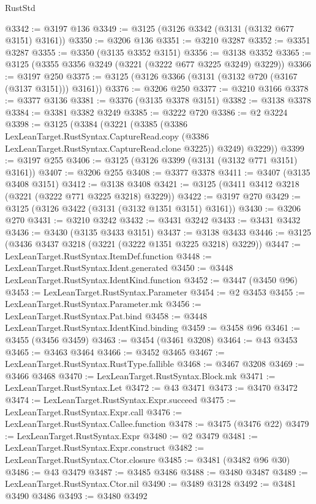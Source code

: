 \begin{lexlean}{RustStd}
\begin{coremodule}
@3342 := @3197 @136
@3349 := @3125 (@3126 @3342 (@3131 (@3132 @677 @3151) @3161))
@3350 := @3206 @136
@3351 := @3210 @3287
@3352 := @3351 @3287
@3355 := @3350 (@3135 @3352 @3151)
@3356 := @3138 @3352
@3365 := @3125 (@3355 @3356 @3249 (@3221 (@3222 @677 @3225 @3249) @3229))
@3366 := @3197 @250
@3375 := @3125 (@3126 @3366 (@3131 (@3132 @720 (@3167 (@3137 @3151))) @3161))
@3376 := @3206 @250
@3377 := @3210 @3166
@3378 := @3377 @3136
@3381 := @3376 (@3135 @3378 @3151)
@3382 := @3138 @3378
@3384 := @3381 @3382 @3249
@3385 := @3222 @720
@3386 := @2 @3224
@3398 := @3125
    (@3384
      (@3221
        (@3385
          (@3386
            LexLeanTarget.RustSyntax.CaptureRead.copy
            (@3386 LexLeanTarget.RustSyntax.CaptureRead.clone @3225))
          @3249)
        @3229))
@3399 := @3197 @255
@3406 := @3125 (@3126 @3399 (@3131 (@3132 @771 @3151) @3161))
@3407 := @3206 @255
@3408 := @3377 @3378
@3411 := @3407 (@3135 @3408 @3151)
@3412 := @3138 @3408
@3421 := @3125 (@3411 @3412 @3218 (@3221 (@3222 @771 @3225 @3218) @3229))
@3422 := @3197 @270
@3429 := @3125 (@3126 @3422 (@3131 (@3132 @1351 @3151) @3161))
@3430 := @3206 @270
@3431 := @3210 @3242
@3432 := @3431 @3242
@3433 := @3431 @3432
@3436 := @3430 (@3135 @3433 @3151)
@3437 := @3138 @3433
@3446 := @3125 (@3436 @3437 @3218 (@3221 (@3222 @1351 @3225 @3218) @3229))
@3447 := LexLeanTarget.RustSyntax.ItemDef.function
@3448 := LexLeanTarget.RustSyntax.Ident.generated
@3450 := @3448 LexLeanTarget.RustSyntax.IdentKind.function
@3452 := @3447 (@3450 @96)
@3453 := LexLeanTarget.RustSyntax.Parameter
@3454 := @2 @3453
@3455 := LexLeanTarget.RustSyntax.Parameter.mk
@3456 := LexLeanTarget.RustSyntax.Pat.bind
@3458 := @3448 LexLeanTarget.RustSyntax.IdentKind.binding
@3459 := @3458 @96
@3461 := @3455 (@3456 @3459)
@3463 := @3454 (@3461 @3208)
@3464 := @43 @3453
@3465 := @3463 @3464
@3466 := @3452 @3465
@3467 := LexLeanTarget.RustSyntax.RustType.fallible
@3468 := @3467 @3208
@3469 := @3466 @3468
@3470 := LexLeanTarget.RustSyntax.Block.mk
@3471 := LexLeanTarget.RustSyntax.Let
@3472 := @43 @3471
@3473 := @3470 @3472
@3474 := LexLeanTarget.RustSyntax.Expr.succeed
@3475 := LexLeanTarget.RustSyntax.Expr.call
@3476 := LexLeanTarget.RustSyntax.Callee.function
@3478 := @3475 (@3476 @22)
@3479 := LexLeanTarget.RustSyntax.Expr
@3480 := @2 @3479
@3481 := LexLeanTarget.RustSyntax.Expr.construct
@3482 := LexLeanTarget.RustSyntax.Ctor.closure
@3485 := @3481 (@3482 @96 @30)
@3486 := @43 @3479
@3487 := @3485 @3486
@3488 := @3480 @3487
@3489 := LexLeanTarget.RustSyntax.Ctor.nil
@3490 := @3489 @3128
@3492 := @3481 @3490 @3486
@3493 := @3480 @3492

\end{coremodule}
\end{lexlean}
